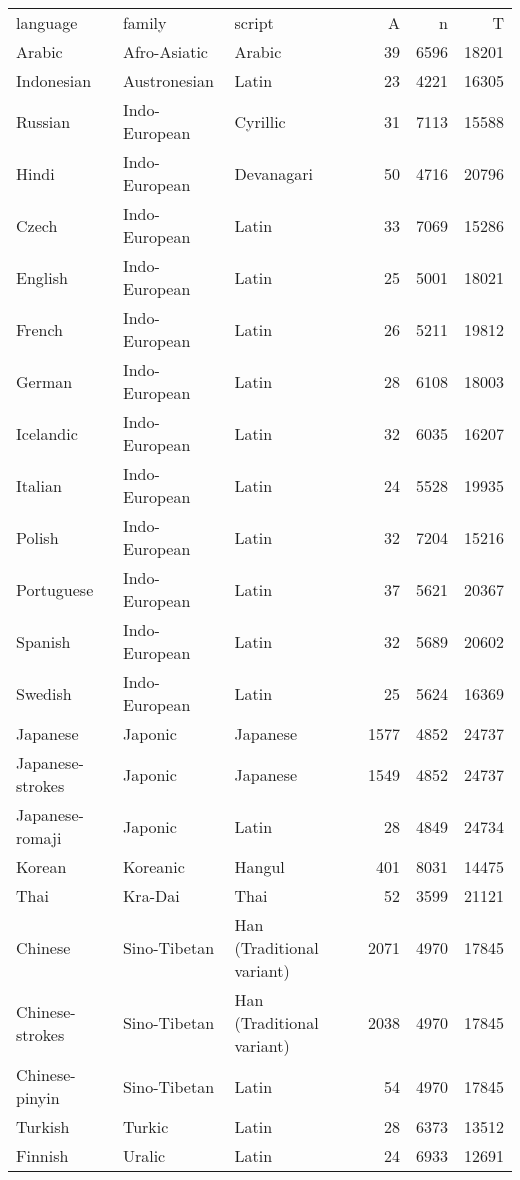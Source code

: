 \begin{table}[ht]
\centering
\begin{tabular}{lllrrr}
 language & family & script & A & n & T \\ 
 Arabic & Afro-Asiatic & Arabic &  39 & 6596 & 18201 \\ 
  Indonesian & Austronesian & Latin &  23 & 4221 & 16305 \\ 
  Russian & Indo-European & Cyrillic &  31 & 7113 & 15588 \\ 
  Hindi & Indo-European & Devanagari &  50 & 4716 & 20796 \\ 
  Czech & Indo-European & Latin &  33 & 7069 & 15286 \\ 
  English & Indo-European & Latin &  25 & 5001 & 18021 \\ 
  French & Indo-European & Latin &  26 & 5211 & 19812 \\ 
  German & Indo-European & Latin &  28 & 6108 & 18003 \\ 
  Icelandic & Indo-European & Latin &  32 & 6035 & 16207 \\ 
  Italian & Indo-European & Latin &  24 & 5528 & 19935 \\ 
  Polish & Indo-European & Latin &  32 & 7204 & 15216 \\ 
  Portuguese & Indo-European & Latin &  37 & 5621 & 20367 \\ 
  Spanish & Indo-European & Latin &  32 & 5689 & 20602 \\ 
  Swedish & Indo-European & Latin &  25 & 5624 & 16369 \\ 
  Japanese & Japonic & Japanese & 1577 & 4852 & 24737 \\ 
  Japanese-strokes & Japonic & Japanese & 1549 & 4852 & 24737 \\ 
  Japanese-romaji & Japonic & Latin &  28 & 4849 & 24734 \\ 
  Korean & Koreanic & Hangul & 401 & 8031 & 14475 \\ 
  Thai & Kra-Dai & Thai &  52 & 3599 & 21121 \\ 
  Chinese & Sino-Tibetan & Han (Traditional variant) & 2071 & 4970 & 17845 \\ 
  Chinese-strokes & Sino-Tibetan & Han (Traditional variant) & 2038 & 4970 & 17845 \\ 
  Chinese-pinyin & Sino-Tibetan & Latin &  54 & 4970 & 17845 \\ 
  Turkish & Turkic & Latin &  28 & 6373 & 13512 \\ 
  Finnish & Uralic & Latin &  24 & 6933 & 12691 \\ 
   \hline
\end{tabular}
\end{table}
